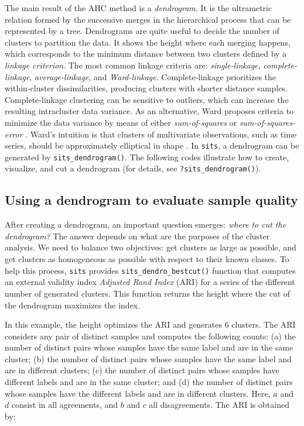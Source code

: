 \documentclass[a4paper,]{tufte-book}
\begin{document}
The main result of the AHC method is a \emph{dendrogram}. It is the ultrametric relation formed by the successive merges in the hierarchical process that can be represented by a tree. Dendrograms are quite useful to decide the number of clusters to partition the data. It shows the height where each merging happens, which corresponds to the minimum distance between two clusters defined by a \emph{linkage criterion}. The most common linkage criteria are: \emph{single-linkage}, \emph{complete-linkage}, \emph{average-linkage}, and \emph{Ward-linkage}. Complete-linkage prioritizes the within-cluster dissimilarities, producing clusters with shorter distance samples. Complete-linkage clustering can be sensitive to outliers, which can increase the resulting intracluster data variance. As an alternative, Ward proposes criteria to minimize the data variance by means of either \emph{sum-of-squares} or \emph{sum-of-squares-error} \citep{Ward1963}. Ward's intuition is that clusters of multivariate observations, such as time series, should be approximately elliptical in shape \citep{Hennig2015}. In \texttt{sits}, a dendrogram can be generated by \texttt{sits\_dendrogram()}. The following codes illustrate how to create, visualize, and cut a dendrogram (for details, see \texttt{?sits\_dendrogram()}).

\hypertarget{using-a-dendrogram-to-evaluate-sample-quality}{%
\subsection{Using a dendrogram to evaluate sample quality}\label{using-a-dendrogram-to-evaluate-sample-quality}}

After creating a dendrogram, an important question emerges: \emph{where to cut the dendrogram?} The answer depends on what are the purposes of the cluster analysis. We need to balance two objectives: get clusters as large as possible, and get clusters as homogeneous as possible with respect to their known classes. To help this process, \texttt{sits} provides \texttt{sits\_dendro\_bestcut()} function that computes an external validity index \emph{Adjusted Rand Index} (ARI) for a series of the different number of generated clusters. This function returns the height where the cut of the dendrogram maximizes the index.

In this example, the height optimizes the ARI and generates \(6\) clusters. The ARI considers any pair of distinct samples and computes the following counts:
(a) the number of distinct pairs whose samples have the same label and are in the same cluster;
(b) the number of distinct pairs whose samples have the same label and are in different clusters;
(c) the number of distinct pairs whose samples have different labels and are in the same cluster; and
(d) the number of distinct pairs whose samples have the different labels and are in different clusters.
Here, \(a\) and \(d\) consist in all agreements, and \(b\) and \(c\) all disagreements. The ARI is obtained by:
\end{document}
